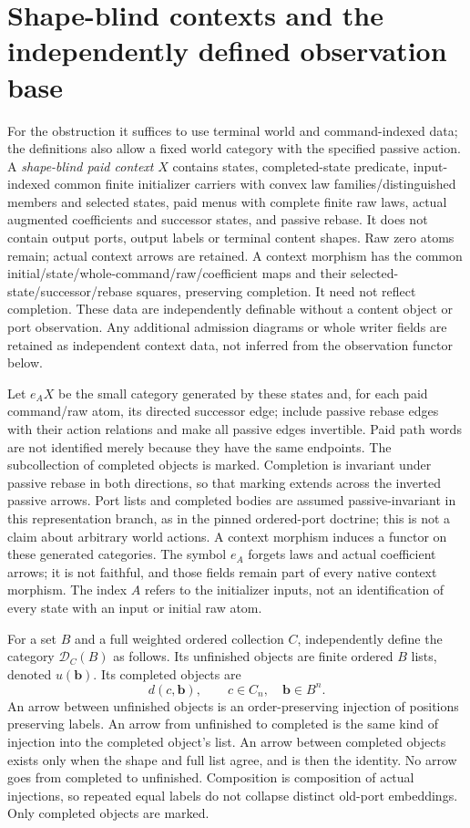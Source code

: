 \documentclass[11pt]{article}\usepackage{amsmath,amssymb,amsthm,geometry}\geometry{margin=1in}
\begin{document}
\section{Shape-blind contexts and the independently defined observation base}
For the obstruction it suffices to use terminal world and command-indexed data; the definitions also allow a fixed world category with the specified passive action. A \emph{shape-blind paid context} $X$ contains states, completed-state predicate, input-indexed common finite initializer carriers with convex law families/distinguished members and selected states, paid menus with complete finite raw laws, actual augmented coefficients and successor states, and passive rebase. It does not contain output ports, output labels or terminal content shapes. Raw zero atoms remain; actual context arrows are retained. A context morphism has the common initial/state/whole-command/raw/coefficient maps and their selected-state/successor/rebase squares, preserving completion. It need not reflect completion. These data are independently definable without a content object or port observation. Any additional admission diagrams or whole writer fields are retained as independent context data, not inferred from the observation functor below.

Let $e_AX$ be the small category generated by these states and, for each paid command/raw atom, its directed successor edge; include passive rebase edges with their action relations and make all passive edges invertible. Paid path words are not identified merely because they have the same endpoints. The subcollection of completed objects is marked. Completion is invariant under passive rebase in both directions, so that marking extends across the inverted passive arrows. Port lists and completed bodies are assumed passive-invariant in this representation branch, as in the pinned ordered-port doctrine; this is not a claim about arbitrary world actions. A context morphism induces a functor on these generated categories. The symbol $e_A$ forgets laws and actual coefficient arrows; it is not faithful, and those fields remain part of every native context morphism. The index $A$ refers to the initializer inputs, not an identification of every state with an input or initial raw atom.

For a set $B$ and a full weighted ordered collection $C$, independently define the category $\mathcal D_C(B)$ as follows. Its unfinished objects are finite ordered $B$ lists, denoted $u(\mathbf b)$. Its completed objects are
\[
 d(c,\mathbf b),\qquad c\in C_n,\quad \mathbf b\in B^n.
\]
An arrow between unfinished objects is an order-preserving injection of positions preserving labels. An arrow from unfinished to completed is the same kind of injection into the completed object's list. An arrow between completed objects exists only when the shape and full list agree, and is then the identity. No arrow goes from completed to unfinished. Composition is composition of actual injections, so repeated equal labels do not collapse distinct old-port embeddings. Only completed objects are marked.
\end{document}
